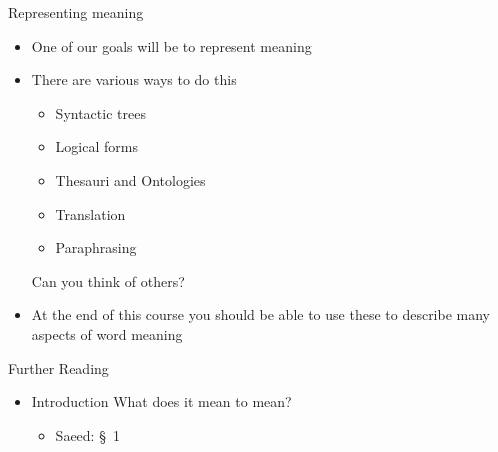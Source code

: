 \begin{frame}{Representing meaning}
\begin{itemize}
\item One of our goals will be to represent meaning
\item There are various ways to do this
  \begin{itemize}
  \item Syntactic trees
  \item Logical forms
  \item Thesauri and Ontologies 
  \item Translation
  \item Paraphrasing
  \end{itemize}
Can you think of others?

\item At the end of this course you should be able to use these to
  describe many aspects of word meaning
\end{itemize}


\end{frame}



\begin{frame}{Further Reading}

\begin{itemize}
\item Introduction What does it mean to mean?
  \begin{itemize}
  \item Saeed: \S~1
  \end{itemize}
\end{itemize}
\end{frame}
